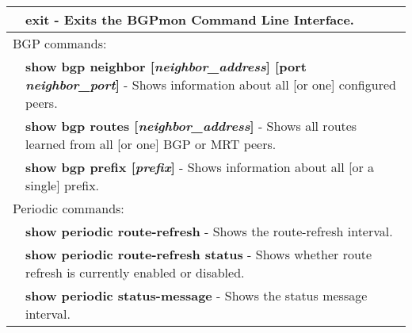 \begin{tabular}{|p{10pt}p{400pt}|}
& {\bf \small exit} - Exits the BGPmon Command Line Interface.\\[4pt]

\hline

\multicolumn{2}{|l|}{BGP commands:}\\ 

\hline

& {\bf \small show bgp neighbor [\emph{neighbor\_address}] [port \emph{neighbor\_port}]} - Shows information about all [or one] configured peers.\\[4pt]

& {\bf \small show bgp routes [\emph{neighbor\_address}]} - Shows all routes learned from all [or one] BGP or MRT peers.\\[4pt]

& {\bf \small show bgp prefix [\emph{prefix}]} - Shows information about all [or a single] prefix.\\[4pt]

\hline

\multicolumn{2}{|l|}{Periodic commands:}\\ 

\hline

& {\bf \small show periodic route-refresh} - Shows the route-refresh interval.\\[4pt]

& {\bf \small show periodic route-refresh status} - Shows whether route refresh is currently enabled or disabled.\\[4pt]

& {\bf \small show periodic status-message} - Shows the status message interval.\\[4pt]

\hline
\end{tabular}

\newpage

